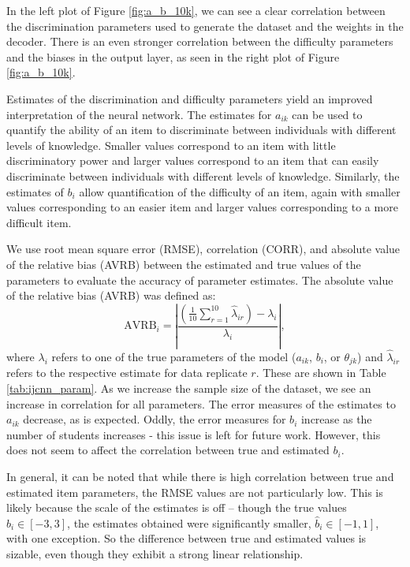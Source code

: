 In the left plot of Figure \ref{fig:a_b_10k}, we can see a clear correlation between the discrimination parameters used to generate the dataset and the weights in the decoder. There is an even stronger correlation between the difficulty parameters and the biases in the output layer, as seen in the right plot of Figure \ref{fig:a_b_10k}.

Estimates of the discrimination and difficulty parameters yield an improved interpretation of the neural network. The estimates for $a_{ik}$ can be used to quantify the ability of an item to discriminate between individuals with different levels of knowledge. Smaller values correspond to an item with little discriminatory power and larger values correspond to an item that can easily discriminate between individuals with different levels of knowledge. Similarly, the estimates of $b_i$ allow quantification of the difficulty of an item, again with smaller values corresponding to an easier item and larger values corresponding to a more difficult item.

We use root mean square error (RMSE), correlation (CORR), and absolute value of the relative bias (AVRB) between the estimated and true values of the parameters to evaluate the accuracy of parameter estimates. The absolute value of the relative bias (AVRB) was defined as: 
\begin{equation}
\text{AVRB}_i = \left| \frac{\left(\frac{1}{10} \sum_{r=1}^{10} \hat \lambda_{ir}\right) - \lambda_{i}}{\lambda_i} \right|,
\label{eq:replicates}
\end{equation}
where $\lambda_i$ refers to one of the true parameters of the model ($a_{ik}$, $b_i$, or $\theta_{jk}$) and $\hat \lambda_{ir}$ refers to the respective estimate for data replicate $r$. These are shown in Table \ref{tab:ijcnn_param}. As we increase the sample size of the dataset, we see an increase in correlation for all parameters. The error measures of the estimates to $a_{ik}$ decrease, as is expected. Oddly, the error measures for $b_i$ increase as the number of students increases - this issue is left for future work. However, this does not seem to affect the correlation between true and estimated $b_i$.

In general, it can be noted that while there is high correlation between true and estimated item parameters, the RMSE values are not particularly low. This is likely because the scale of the estimates is off -- though the true values $b_i \in [-3,3]$, the estimates obtained were significantly smaller, $\hat b_i \in [-1,1]$, with one exception. So the difference between true and estimated values is sizable, even though they exhibit a strong linear relationship.

